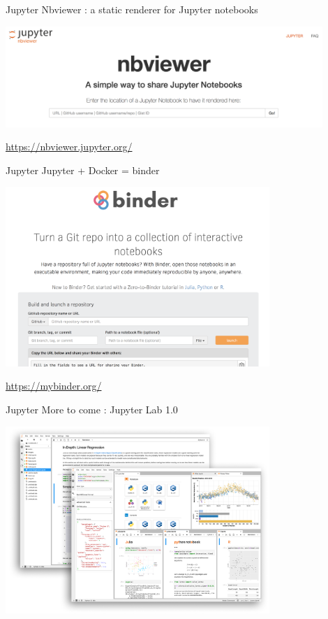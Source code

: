 \begin{frame}{Jupyter}
Nbviewer : a static renderer for Jupyter notebooks

\begin{center}
    \includegraphics[width=12cm]{07_notebook/images/nbviewer.png}
\end{center}

\url{https://nbviewer.jupyter.org/}
\end{frame}

\begin{frame}{Jupyter}
Jupyter + Docker = binder

\begin{center}
    \includegraphics[width=10cm]{07_notebook/images/binder.png}
\end{center}

\url{https://mybinder.org/}
\end{frame}

\begin{frame}{Jupyter}
More to come : Jupyter Lab 1.0

\begin{center}
    \includegraphics[width=10cm]{07_notebook/images/jupyter_labpreview.png}
\end{center}

\end{frame}

